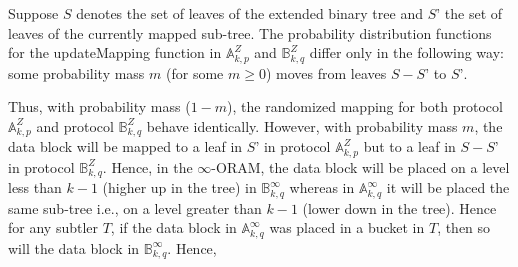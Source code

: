 \documentclass[USenglish,oneside,twocolumn]{article}
\begin{document}
Suppose $S$ denotes the set of leaves of the extended binary tree and $S’$ the set of leaves of the currently mapped sub-tree. The probability distribution functions for the updateMapping function in $\mathbb{A}_{k,p}^Z$ and $\mathbb{B}_{k,q}^Z$ differ only in the following way: some probability mass $m$ (for some $m \geq 0$) moves from leaves $S-S’$ to $S’$.

Thus, with probability mass ($1-m$), the randomized mapping for both protocol $\mathbb{A}_{k,p}^Z$ and protocol $\mathbb{B}_{k,q}^Z$ behave identically. However, with probability mass $m$, the data block will be mapped to a leaf in $S’$ in protocol $\mathbb{A}_{k,p}^Z$ but to a leaf in $S-S’$ in protocol $\mathbb{B}_{k,q}^Z$. Hence, in the $\infty$-ORAM, the data block will be placed on a level less than $k-1$ (higher up in the tree) in $\mathbb{B}_{k,q}^{\infty}$ whereas in $\mathbb{A}_{k,q}^{\infty}$ it will be placed the same sub-tree i.e., on a level greater than $k-1$ (lower down in the tree). Hence for any subtler $T$, if the data block in $\mathbb{A}_{k,q}^{\infty}$ was placed in a bucket in $T$, then so will the data block in $\mathbb{B}_{k,q}^{\infty}$. Hence,
\end{document}
